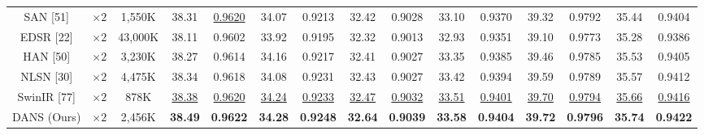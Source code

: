 \documentclass{ieeeaccess}
\begin{document}
\begin{table}
\begin{tabular}{|c|c|c|cc|cc|cc|cc|cc|cc|}
SAN [51]& $\times 2$&1,550K& \multicolumn{1}{c|}{38.31} &{\color{blue}\underline{0.9620}} & \multicolumn{1}{c|}{34.07} & 0.9213 &\multicolumn{1}{c|}{32.42} &0.9028& \multicolumn{1}{c|}{33.10} &0.9370 & \multicolumn{1}{c|}{39.32} & 0.9792
&\multicolumn{1}{c|}{35.44} &0.9404\\

EDSR [22] & $\times 2$&43,000K& \multicolumn{1}{c|}{38.11} & 0.9602 & \multicolumn{1}{c|}{33.92} & 0.9195  &\multicolumn{1}{c|}{32.32} & 0.9013 & \multicolumn{1}{c|}{32.93} & 0.9351  & \multicolumn{1}{c|}{39.10} & 0.9773
&\multicolumn{1}{c|}{35.28} &0.9386\\

HAN [50] & $\times 2$&3,230K& \multicolumn{1}{c|}{38.27} & 0.9614  & \multicolumn{1}{c|}{34.16} & 0.9217  &\multicolumn{1}{c|}{32.41} & 0.9027 & \multicolumn{1}{c|}{33.35} &0.9385& \multicolumn{1}{c|}{39.46} & 0.9785
&\multicolumn{1}{c|}{35.53} &0.9405\\

NLSN [30] & $\times 2$ &4,475K& \multicolumn{1}{c|}{38.34} & 0.9618 & \multicolumn{1}{c|}{34.08} & 0.9231 & \multicolumn{1}{c|}{32.43} & 0.9027 & \multicolumn{1}{c|}{33.42} &0.9394 & \multicolumn{1}{c|}{39.59} & 0.9789
&\multicolumn{1}{c|}{35.57} & 0.9412\\

SwinIR [77] & $\times 2$ &878K& \multicolumn{1}{c|}{\color{blue}\underline{38.38}} & {\color{blue}\underline{0.9620}} & \multicolumn{1}{c|}{\color{blue}\underline{34.24}} &{\color{blue}\underline{ 0.9233}} & \multicolumn{1}{c|}{\color{blue}\underline{32.47}} & {\color{blue}\underline{0.9032}} & \multicolumn{1}{c|}{\color{blue}\underline{33.51}} & {\color{blue}\underline{0.9401}} & \multicolumn{1}{c|}{\color{blue}\underline{39.70}} &{\color{blue}\underline{0.9794}}
&\multicolumn{1}{c|}{\color{blue}\underline{35.66}} & {\color{blue}\underline{ 0.9416}}\\

DANS (Ours) & $\times 2$ &2,456K& \multicolumn{1}{c|}{\color{red}\textbf{38.49}} &{\color{red}\textbf{0.9622}} & \multicolumn{1}{c|}{\color{red}\textbf{34.28} } &{\color{red}\textbf{ 0.9248}} & \multicolumn{1}{c|}{\color{red}\textbf{32.64}} &{\color{red}\textbf{0.9039}}& \multicolumn{1}{c|}{\color{red}\textbf{33.58}} &{\color{red}\textbf{0.9404}}& \multicolumn{1}{c|}{\color{red}\textbf{39.72}} &{\color{red}\textbf{0.9796}} &\multicolumn{1}{c|}{\color{red}\textbf{35.74}} & {\color{red}\textbf{0.9422}}\\
\hline


\end{tabular}
\end{table}
\end{document}
